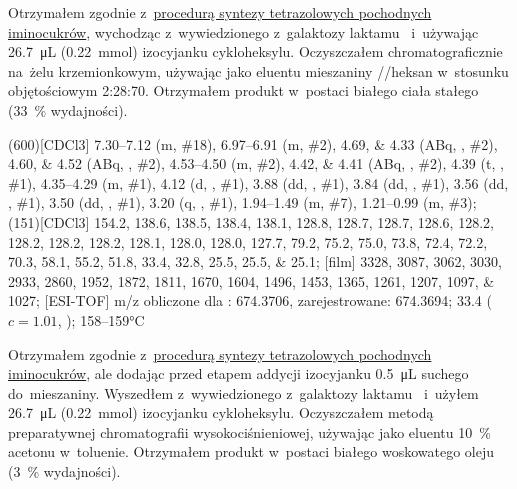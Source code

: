 Otrzymałem zgodnie z~\hyperref[experimental:sugars:schwartz]{procedurą syntezy tetrazolowych
	pochodnych iminocukrów}, wychodząc z~wywiedzionego z~galaktozy laktamu~
	i~używając \SI{26.7}{\micro\liter} (\SI{0.22}{\milli\mol}) izocyjanku cykloheksylu.
Oczyszczałem chromatograficznie na~żelu krzemionkowym,
	używając jako eluentu mieszaniny //heksan w~stosunku objętościowym
	\num{2}:\num{28}:\num{70}.
Otrzymałem produkt w~postaci białego ciała stałego (\SI{33}{\percent} wydajności).

\begin{fullexp}
	\NMR(600)[CDCl3] \numrange{7.30}{7.12} (m, \#{18}), \numrange{6.97}{6.91} (m, \#{2}), \numlist{4.69;4.33} (ABq, , \#{2}), \numlist{4.60;4.52} (ABq, , \#{2}), \numrange{4.53}{4.50} (m, \#{2}), \numlist{4.42;4.41} (ABq, , \#{2}), \num{4.39} (t, , \#{1}), \numrange{4.35}{4.29} (m, \#{1}), \num{4.12} (d, , \#{1}), \num{3.88} (dd, , \#{1}), \num{3.84} (dd, , \#{1}), \num{3.56} (dd, , \#{1}), \num{3.50} (dd, , \#{1}), \num{3.20} (q, , \#{1}), \numrange{1.94}{1.49} (m, \#{7}), \numrange{1.21}{0.99} (m, \#{3});
	(151)[CDCl3] \numlist{154.2; 138.6; 138.5; 138.4; 138.1; 128.8; 128.7; 128.7; 128.6; 128.2; 128.2; 128.2; 128.2; 128.1; 128.0; 128.0; 127.7; 79.2; 75.2; 75.0; 73.8; 72.4; 72.2; 70.3; 58.1; 55.2; 51.8; 33.4; 32.8; 25.5; 25.5; 25.1};
	[film] \numlist{3328; 3087; 3062; 3030; 2933; 2860; 1952; 1872; 1811; 1670; 1604; 1496; 1453; 1365; 1261; 1207; 1097; 1027};
	[ESI-TOF] m/z obliczone dla : \num{674.3706}, zarejestrowane: \num{674.3694};
	\data{[$\alpha^{23}_D$]~$=$} \num{33.4} ($c = 1.01$, );
	 \numrange{158}{159}\si{\celsius}
\end{fullexp}

Otrzymałem zgodnie z~\hyperref[experimental:sugars:schwartz]{procedurą syntezy tetrazolowych
	pochodnych iminocukrów}, ale dodając przed etapem addycji izocyjanku
	\SI{0.5}{\micro\liter} suchego  do~mieszaniny.
Wyszedłem z~wywiedzionego z~galaktozy laktamu~
	i~użyłem \SI{26.7}{\micro\liter} (\SI{0.22}{\milli\mol}) izocyjanku cykloheksylu.
Oczyszczałem metodą preparatywnej chromatografii wysokociśnieniowej,
	używając jako eluentu \SI{10}{\percent} acetonu w~toluenie.
Otrzymałem produkt w~postaci białego woskowatego oleju (\SI{3}{\percent} wydajności).

